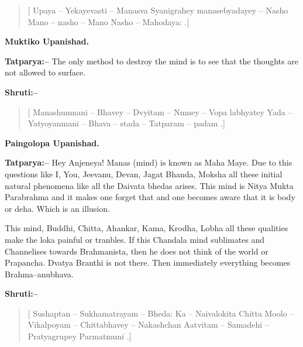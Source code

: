 \begin{verse}
[ Upaya – Yekayevasti – Manasva Syanigrahey manasebyadayey – Nasho Mano – nasho – Mano Nasho – Mahodaya: .]
\end{verse}

\begin{flushright}
\textbf{Muktiko Upanishad.}
\end{flushright}

\textbf{Tatparya:–} The only method to destroy the mind is to see that the thoughts are not allowed to surface.

\textbf{Shruti:–}

\begin{verse}
[ Manashumnani – Bhavey – Dvyitam – Nmney – Vopa labhyatey  Yada – Yatyoyanmani – Bhava – stada – Tatparam – padam .]
\end{verse}

\begin{flushright}
\textbf{Paingolopa Upanishad.}
\end{flushright}

\textbf{Tatparya:–} Hey Anjeneya! Manas (mind) is known as Maha Maye. Due to this questions like I, You, Jeevanu, Devan, Jagat Bhanda, Moksha all these initial natural phenomena like all the Daivata bhedas arises. This mind is Nitya Mukta Parabrahma and it makes one forget that and one becomes aware that it is body or deha. Which is an illusion.

This mind, Buddhi, Chitta, Ahankar, Kama, Krodha, Lobha all these qualities make the loka painful or tranbles. If this Chandala mind sublimates and Channelises towards Brahmanista, then he does not think of the world or Prapancha. Dvatya Branthi is not there. Then immediately everything becomes Brahma–anubhava.

\textbf{Shruti:–}

\begin{verse}
[ Sushaptan – Sukhamatrayam – Bheda: Ka – Naivalokita  Chitta Moolo – Vikalpoyam – Chittabhavey – Nakashchan Aatvitam – Samadehi – Pratyagrupey Parmatmuni .]
\end{verse}

